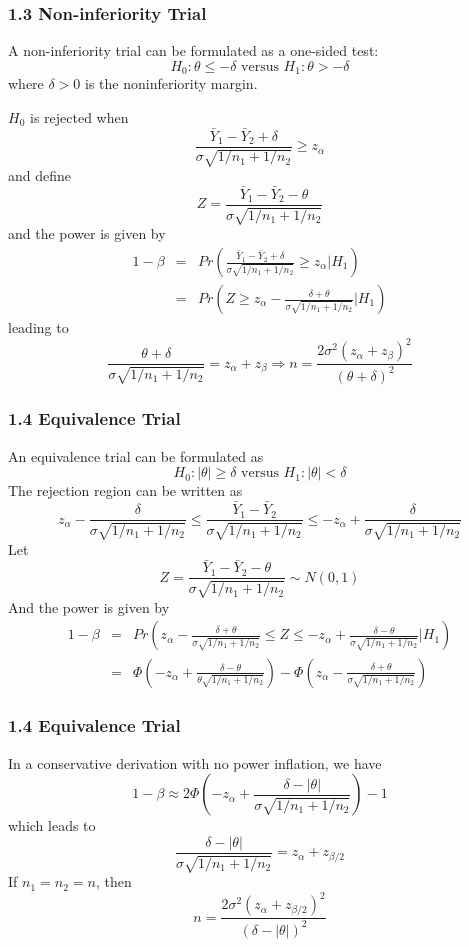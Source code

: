\documentclass[table,10pt]{beamer}
\begin{document}
\begin{CJK*}{UTF8}{gbsn}
\begin{frame}[t]
\frametitle{1.3 Non-inferiority Trial}
A non-inferiority trial can be formulated as a one-sided test:
$$
H_0: \theta \le -\delta \mbox{ versus } H_1: \theta > -\delta
$$
where $\delta > 0$ is the noninferiority margin.

$H_0$ is rejected when
$$
\frac{\bar{Y}_1 - \bar{Y}_2 + \delta}{\sigma \sqrt{1/n_1 + 1/n_2}} \ge z_{\alpha}
$$
and define
$$
Z = \frac{\bar{Y}_1 - \bar{Y}_2 - \theta}{\sigma \sqrt{1/n_1 + 1/n_2}}
$$
and the power is given by
$$
\begin{array}{lcl}
1-\beta &=& Pr\left( \frac{\bar{Y}_1 - \bar{Y}_2 + \delta}{\sigma \sqrt{1/n_1 + 1/n_2}} \ge z_{\alpha} \big| H_1 \right)\\
&=& Pr \left( Z \ge z_{\alpha} - \frac{\delta + \theta}{\sigma \sqrt{1/n_1 + 1/n_2}} \big| H_1 \right)
\end{array}
$$
leading to
$$
\frac{\theta + \delta}{\sigma \sqrt{1/n_1 + 1/n_2}} = z_{\alpha} + z_{\beta} \Rightarrow n = \frac{2\sigma^2(z_{\alpha} + z_{\beta})^2}{(\theta + \delta)^2}
$$
\end{frame}


\begin{frame}[t]
\frametitle{1.4 Equivalence Trial}
An equivalence trial can be formulated as
$$
H_0: | \theta | \ge \delta \mbox{ versus } H_1: |\theta| < \delta
$$
The rejection region can be written as
$$
z_{\alpha} - \frac{\delta}{\sigma \sqrt{1/n_1+1/n_2}} \le \frac{\bar{Y}_1 - \bar{Y}_2}{\sigma \sqrt{1/n_1+1/n_2}} \le -z_{\alpha} + \frac{\delta}{\sigma \sqrt{1/n_1+1/n_2}}
$$
Let
$$
Z = \frac{\bar{Y}_1 - \bar{Y}_2 - \theta}{\sigma \sqrt{1/n_1+1/n_2}} \sim N(0,1)
$$
And the power is given by
$$
\begin{array}{lcl}
1-\beta &=& Pr \left( z_{\alpha} - \frac{\delta + \theta}{\sigma \sqrt{1/n_1+1/n_2}} \le Z \le - z_{\alpha} + \frac{\delta - \theta}{\sigma \sqrt{1/n_1+1/n_2}} \big| H_1 \right)\\
&=& \Phi\left( -z_{\alpha} + \frac{\delta - \theta}{\theta \sqrt{1/n_1 + 1/n_2}}\right) - \Phi \left( z_{\alpha} - \frac{\delta+\theta}{\sigma \sqrt{1/n_1 + 1/n_2}}\right)  
\end{array}
$$
\end{frame}

\begin{frame}[t]
\frametitle{1.4 Equivalence Trial}
In a conservative derivation with no power inflation, we have
$$
1-\beta \approx 2 \Phi\left( -z_{\alpha} + \frac{\delta - |\theta|}{\sigma \sqrt{1/n_1 + 1/n_2}} \right) - 1
$$
which leads to
$$
\frac{\delta - |\theta|}{\sigma \sqrt{1/n_1 + 1/n_2}} = z_{\alpha} + z_{\beta/2}
$$
If $n_1 = n_2 = n$, then
$$
n = \frac{2\sigma^2(z_{\alpha} + z_{\beta/2})^2}{(\delta - |\theta|)^2}
$$


\end{frame}
\end{CJK*}
\end{document}
